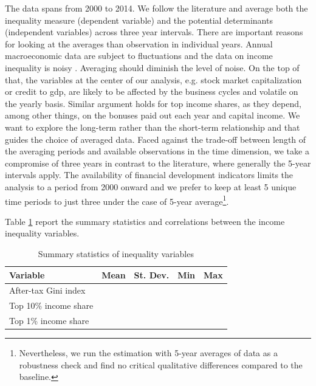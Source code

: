 \documentclass[a4paper,11pt]{article}
\begin{document}
The data spans from 2000 to 2014. We follow the literature \citep{dabla2015causes,de2017finance} and average both the inequality measure (dependent variable) and the potential determinants (independent variables) across three year intervals. There are important reasons for looking at the averages than observation in individual years. Annual macroeconomic data are subject to fluctuations and the data on income inequality is noisy \citet{delis2014}. Averaging should diminish the level of noise. On the top of that, the variables at the center of our analysis, e.g. stock market capitalization or credit to \ac{gdp}, are likely to be affected by the business cycles and volatile on the yearly basis. Similar argument holds for top income shares, as they depend, among other things, on the bonuses paid out each year and capital income. We want to explore the long-term rather than the short-term relationship and that guides the choice of averaged data. Faced against the trade-off between length of the averaging periods and available observations in the time dimension, we take a compromise of three years in contrast to the literature, where generally the 5-year intervals apply. The availability of financial development indicators limits the analysis to a period from 2000 onward and we prefer to keep at least 5 unique time periods to just three under the case of 5-year average\footnote{Nevertheless, we run the estimation with 5-year averages of data as a robustness check and find no critical qualitative differences compared to the baseline.}.

Table \ref{tab:ineq} report the summary statistics and correlations between the income inequality variables.

\begin{table}[ht!]
    \small
    \caption{Summary statistics of inequality variables}
    \label{tab:ineq}
    \centering
       \begin{tabular}{lrrrr}
        \toprule
        Variable & Mean & St. Dev. & Min & Max \\
        \midrule
        After-tax Gini index  & & & & \\
        Top 10\% income share & & & & \\
        Top 1\% income share & & & & \\
        \bottomrule
    \end{tabular}
\end{table}
\end{document}
